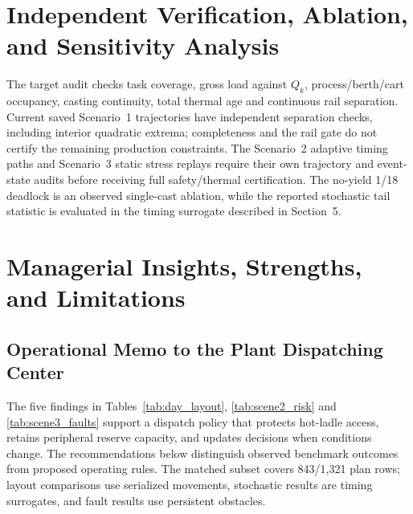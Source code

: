 \documentclass[11pt,a4paper]{article}
\begin{document}
\section{Independent Verification, Ablation, and Sensitivity Analysis}

The target audit checks task coverage, gross load against $Q_k$, process/berth/cart occupancy, casting continuity, total thermal age and continuous rail separation. Current saved Scenario~1 trajectories have independent separation checks, including interior quadratic extrema; completeness and the rail gate do not certify the remaining production constraints. The Scenario~2 adaptive timing paths and Scenario~3 static stress replays require their own trajectory and event-state audits before receiving full safety/thermal certification. The no-yield 1/18 deadlock is an observed single-cast ablation, while the reported stochastic tail statistic is evaluated in the timing surrogate described in Section~5.

\section{Managerial Insights, Strengths, and Limitations}

\subsection{Operational Memo to the Plant Dispatching Center}
The five findings in Tables~\ref{tab:day_layout}, \ref{tab:scene2_risk} and \ref{tab:scene3_faults} support a dispatch policy that protects hot-ladle access, retains peripheral reserve capacity, and updates decisions when conditions change. The recommendations below distinguish observed benchmark outcomes from proposed operating rules. The matched subset covers 843/1,321 plan rows; layout comparisons use serialized movements, stochastic results are timing surrogates, and fault results use persistent obstacles.
\end{document}
